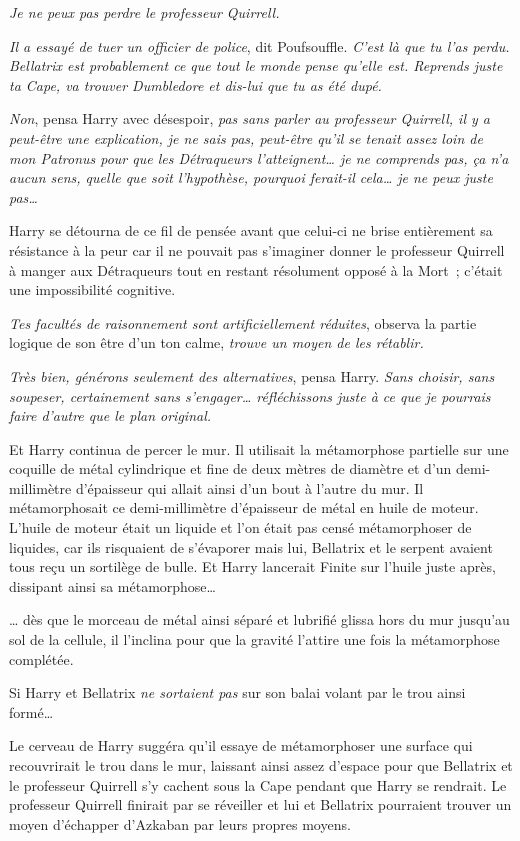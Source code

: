 \emph{Je ne peux pas perdre le professeur Quirrell.}

\emph{Il a essayé de tuer un officier de police}, dit Poufsouffle.
\emph{C'est là que tu l'as perdu.
Bellatrix est probablement ce que tout le monde pense qu'elle est.
Reprends juste ta Cape, va trouver Dumbledore et dis-lui que tu as été dupé.}

\emph{Non}, pensa Harry avec désespoir, \emph{pas sans parler au professeur Quirrell, il y a peut-être une explication, je ne sais pas, peut-être qu'il se tenait assez loin de mon Patronus pour que les Détraqueurs l'atteignent… je ne comprends pas, ça n'a aucun sens, quelle que soit l'hypothèse, pourquoi ferait-il cela… je ne peux juste pas…}

Harry se détourna de ce fil de pensée avant que celui-ci ne brise entièrement sa résistance à la peur car il ne pouvait pas s'imaginer donner le professeur Quirrell à manger aux Détraqueurs tout en restant résolument opposé à la Mort~; c'était une impossibilité cognitive.

\emph{Tes facultés de raisonnement sont artificiellement réduites}, observa la partie logique de son être d'un ton calme, \emph{trouve un moyen de les rétablir.}

\emph{Très bien, générons seulement des alternatives}, pensa Harry.
\emph{Sans choisir, sans soupeser, certainement sans s'engager… réfléchissons juste à ce que je pourrais faire d'autre que le plan original.}

Et Harry continua de percer le mur.
Il utilisait la métamorphose partielle sur une coquille de métal cylindrique et fine de deux mètres de diamètre et d'un demi-millimètre d'épaisseur qui allait ainsi d'un bout à l'autre du mur.
Il métamorphosait ce demi-millimètre d'épaisseur de métal en huile de moteur.
L'huile de moteur était un liquide et l'on était pas censé métamorphoser de liquides, car ils risquaient de s'évaporer mais lui, Bellatrix et le serpent avaient tous reçu un sortilège de bulle.
Et Harry lancerait Finite sur l'huile juste après, dissipant ainsi sa métamorphose…

… dès que le morceau de métal ainsi séparé et lubrifié glissa hors du mur jusqu'au sol de la cellule, il l'inclina pour que la gravité l'attire une fois la métamorphose complétée.

Si Harry et Bellatrix \emph{ne sortaient pas} sur son balai volant par le trou ainsi formé…

Le cerveau de Harry suggéra qu'il essaye de métamorphoser une surface qui recouvrirait le trou dans le mur, laissant ainsi assez d'espace pour que Bellatrix et le professeur Quirrell s'y cachent sous la Cape pendant que Harry se rendrait.
Le professeur Quirrell finirait par se réveiller et lui et Bellatrix pourraient trouver un moyen d'échapper d'Azkaban par leurs propres moyens.

